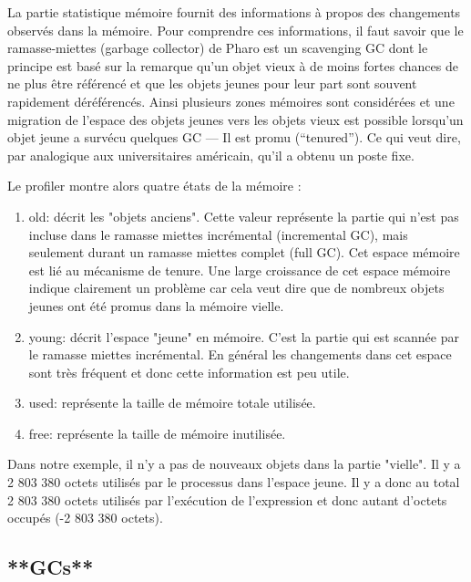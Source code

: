 \documentclass[a4paper,10pt,twoside]{book}
\begin{document}
La partie statistique m\'emoire fournit des informations \`a propos
des changements observ\'es dans la m\'emoire. 
Pour comprendre ces informations, il faut savoir que le
ramasse-miettes (garbage collector) de Pharo est
un scavenging GC dont le principe est bas\'e sur la
remarque qu'un objet vieux \`a de moins fortes chances de ne plus
\^etre r\'ef\'erenc\'e et que les objets jeunes pour leur part sont
souvent rapidement d\'er\'ef\'erenc\'es. Ainsi plusieurs zones
m\'emoires sont consid\'er\'ees et une migration de l'espace des
objets jeunes vers les objets vieux est possible lorsqu'un objet
jeune a surv\'ecu quelques GC --- Il est promu (``tenured''). Ce qui veut dire,
par analogique aux universitaires am\'ericain, qu'il a obtenu un poste
fixe. 

Le profiler montre alors quatre \'etats de la m\'emoire :

\begin{enumerate}
\item old: d\'ecrit les "objets anciens". Cette valeur repr\'esente la
  partie qui n'est pas incluse dans le ramasse miettes incr\'emental
  (incremental GC),  mais seulement durant un ramasse miettes complet
  (full GC). Cet espace m\'emoire est li\'e au m\'ecanisme de tenure. Une large croissance de cet espace m\'emoire indique
  clairement un probl\`eme car cela veut dire que de nombreux objets  jeunes ont \'et\'e promus dans la m\'emoire vielle.

\item young: d\'ecrit l'espace "jeune" en m\'emoire. C'est la partie
  qui est scann\'ee par le  ramasse miettes incr\'emental. En
  g\'en\'eral les changements dans cet espace sont tr\`es fr\'equent
  et donc cette information est peu utile.

\item used: repr\'esente la taille de m\'emoire totale  utilis\'ee.

\item free: repr\'esente la taille de m\'emoire inutilis\'ee.
\end{enumerate}

Dans notre exemple, il n'y a pas de nouveaux objets dans la partie "vielle". Il y a
2 803 380 octets utilis\'es par le processus dans l'espace jeune. Il y a
donc au total 2 803 380 octets utilis\'es par l'ex\'ecution de
l'expression et donc autant d'octets occup\'es (-2 803 380 octets).

\subsection{**GCs**}
\end{document}

